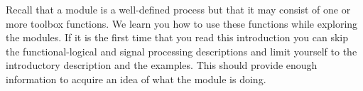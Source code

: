 Recall that a module is a well-defined process but that it may
consist of one or more toolbox functions. We learn you how to use
these functions while exploring the modules. If it is the first
time that you read this introduction you can skip the
functional-logical and signal processing descriptions and limit
yourself to the introductory description and the examples. This
should provide enough information to acquire an idea of what the
module is doing.














